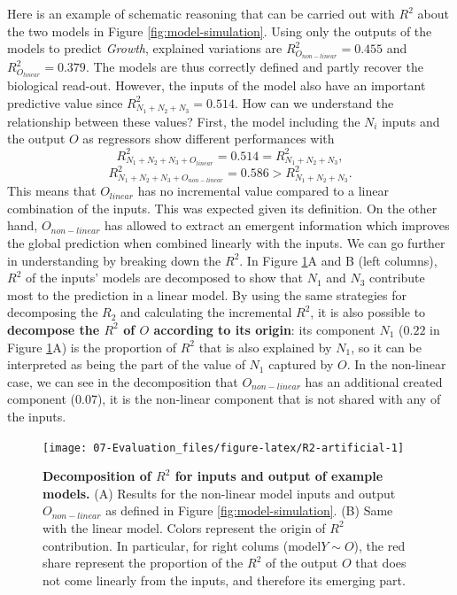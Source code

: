 \documentclass[a4paper,12pt,twoside,onecolumn,openright,final,oldfontcommands]{memoir}
\begin{document}
Here is an example of schematic reasoning that can be carried out with
\(R^2\) about the two models in Figure \ref{fig:model-simulation}. Using
only the outputs of the models to predict \emph{Growth}, explained
variations are \(R^2_{O_{non-linear}}=0.455\) and
\(R^2_{O_{linear}}=0.379\). The models are thus correctly defined and
partly recover the biological read-out. However, the inputs of the model
also have an important predictive value since
\(R^2_{N_1+N_2+N_3}=0.514\). How can we understand the relationship
between these values? First, the model including the \(N_i\) inputs and
the output \(O\) as regressors show different performances with
\[R^2_{N_1+N_2+N_3+O_{linear}}=0.514=R^2_{N_1+N_2+N_3},\]
\[R^2_{N_1+N_2+N_3+O_{non-linear}}=0.586>R^2_{N_1+N_2+N_3}.\] This means
that \(O_{linear}\) has no incremental value compared to a linear
combination of the inputs. This was expected given its definition. On
the other hand, \(O_{non-linear}\) has allowed to extract an emergent
information which improves the global prediction when combined linearly
with the inputs. We can go further in understanding by breaking down the
\(R^2\). In Figure \ref{fig:R2-artificial}A and B (left columns),
\(R^2\) of the inputs' models are decomposed to show that \(N_1\) and
\(N_3\) contribute most to the prediction in a linear model. By using
the same strategies for decomposing the \(R_2\) and calculating the
incremental \(R^2\), it is also possible to \textbf{decompose the
\(R^2\) of \(O\) according to its origin}: its component \(N_1\)
(\(0.22\) in Figure \ref{fig:R2-artificial}A) is the proportion of
\(R^2\) that is also explained by \(N_1\), so it can be interpreted as
being the part of the value of \(N_1\) captured by \(O\). In the
non-linear case, we can see in the decomposition that \(O_{non-linear}\)
has an additional created component (\(0.07\)), it is the non-linear
component that is not shared with any of the inputs.

\begin{figure}

{\centering \texttt{[image: 07-Evaluation\_files/figure-latex/R2-artificial-1]} 

}

\caption[Decomposition of $R^2$ for inputs and output of example models]{\textbf{Decomposition of \(R^2\) for inputs
and output of example models.} (A) Results for the non-linear model
inputs and output \(O_{non-linear}\) as defined in Figure
\ref{fig:model-simulation}. (B) Same with the linear model. Colors
represent the origin of \(R^2\) contribution. In particular, for right
colums (model\(Y\sim O\)), the red share represent the proportion of the
\(R^2\) of the output \(O\) that does not come linearly from the inputs,
and therefore its emerging part.}\label{fig:R2-artificial}
\end{figure}
\end{document}
